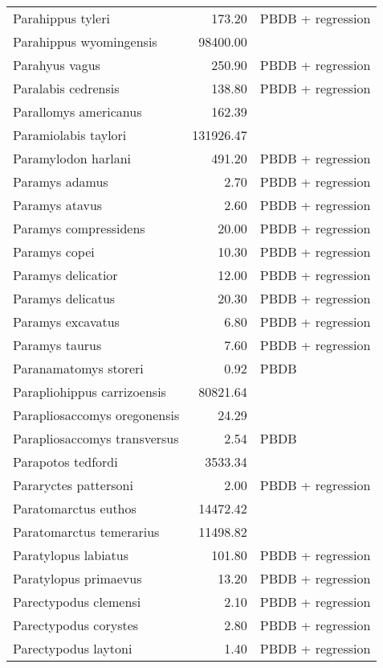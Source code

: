 \begin{table}[ht]
\begin{tabular}{lrl}
  Parahippus tyleri & 173.20 & PBDB + regression \\ 
  Parahippus wyomingensis & 98400.00 & \cite{MacFadden1986} \\ 
  Parahyus vagus & 250.90 & PBDB + regression \\ 
  Paralabis cedrensis & 138.80 & PBDB + regression \\ 
  Parallomys americanus & 162.39 & \cite{Tomiya2013} \\ 
  Paramiolabis taylori & 131926.47 & \cite{Tomiya2013} \\ 
  Paramylodon harlani & 491.20 & PBDB + regression \\ 
  Paramys adamus & 2.70 & PBDB + regression \\ 
  Paramys atavus & 2.60 & PBDB + regression \\ 
  Paramys compressidens & 20.00 & PBDB + regression \\ 
  Paramys copei & 10.30 & PBDB + regression \\ 
  Paramys delicatior & 12.00 & PBDB + regression \\ 
  Paramys delicatus & 20.30 & PBDB + regression \\ 
  Paramys excavatus & 6.80 & PBDB + regression \\ 
  Paramys taurus & 7.60 & PBDB + regression \\ 
  Paranamatomys storeri & 0.92 & PBDB \\ 
  Parapliohippus carrizoensis & 80821.64 & \cite{Tomiya2013} \\ 
  Parapliosaccomys oregonensis & 24.29 & \cite{Tomiya2013} \\ 
  Parapliosaccomys transversus & 2.54 & PBDB \\ 
  Parapotos tedfordi & 3533.34 & \cite{Tomiya2013} \\ 
  Pararyctes pattersoni & 2.00 & PBDB + regression \\ 
  Paratomarctus euthos & 14472.42 & \cite{Tomiya2013} \\ 
  Paratomarctus temerarius & 11498.82 & \cite{Tomiya2013} \\ 
  Paratylopus labiatus & 101.80 & PBDB + regression \\ 
  Paratylopus primaevus & 13.20 & PBDB + regression \\ 
  Parectypodus clemensi & 2.10 & PBDB + regression \\ 
  Parectypodus corystes & 2.80 & PBDB + regression \\ 
  Parectypodus laytoni & 1.40 & PBDB + regression \\ 

\end{tabular}
\end{table}
